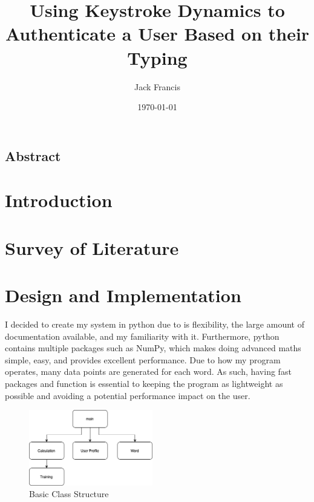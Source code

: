 \documentclass[10pt,a4paper]{report}
\title{Using Keystroke Dynamics to Authenticate a User Based on their Typing}
\author{Jack Francis}
\date{\today}
\begin{document}
\maketitle


\section{Abstract}

\tableofcontents

\chapter{Introduction}
\setcounter{page}{1}



\chapter{Survey of Literature}

\chapter{Design and Implementation}

I decided to create my system in python due to is flexibility, the large amount of documentation available, and my familiarity with it. Furthermore, python contains multiple packages such as NumPy, which makes doing advanced maths simple, easy, and provides excellent performance. Due to how my program operates, many data points are generated for each word. As such, having fast packages and function is essential to keeping the program as lightweight as possible and avoiding a potential performance impact on the user.

\begin{figure}
	\begin{center}
		\includegraphics[width=0.48\textwidth]{OOP}
	\end{center}
	\caption{Basic Class Structure}
	\label{fig:ClassStruct}
\end{figure}
\end{document}
